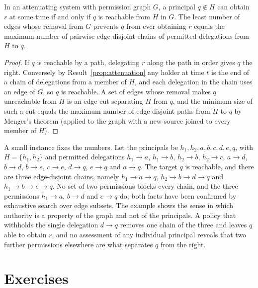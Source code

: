 \begin{newresult}\label{prop:cut}
In an attenuating system with permission graph $G$, a principal $q\notin H$ can obtain $r$ at some time if and only if $q$ is reachable from $H$ in $G$. The least number of edges whose removal from $G$ prevents $q$ from ever obtaining $r$ equals the maximum number of pairwise edge-disjoint chains of permitted delegations from $H$ to $q$.
\end{newresult}
\begin{proof}
If $q$ is reachable by a path, delegating $r$ along the path in order gives $q$ the right. Conversely by Result~\ref{prop:attenuation} any holder at time $t$ is the end of a chain of delegations from a member of $H$, and each delegation in the chain uses an edge of $G$, so $q$ is reachable. A set of edges whose removal makes $q$ unreachable from $H$ is an edge cut separating $H$ from $q$, and the minimum size of such a cut equals the maximum number of edge-disjoint paths from $H$ to $q$ by Menger's theorem (applied to the graph with a new source joined to every member of $H$).
\end{proof}

A small instance fixes the numbers. Let the principals be $h_1,h_2,a,b,c,d,e,q$, with $H=\{h_1,h_2\}$ and permitted delegations $h_1\to a$, $h_1\to b$, $h_2\to b$, $h_2\to c$, $a\to d$, $b\to d$, $b\to e$, $c\to e$, $d\to q$, $e\to q$ and $a\to q$. The target $q$ is reachable, and there are three edge-disjoint chains, namely $h_1\to a\to q$, $h_2\to b\to d\to q$ and $h_1\to b\to e\to q$. No set of two permissions blocks every chain, and the three permissions $h_1\to a$, $b\to d$ and $e\to q$ do; both facts have been confirmed by exhaustive search over edge subsets. The example shows the sense in which authority is a property of the graph and not of the principals. A policy that withholds the single delegation $d\to q$ removes one chain of the three and leaves $q$ able to obtain $r$, and no assessment of any individual principal reveals that two further permissions elsewhere are what separates $q$ from the right.

\section*{Exercises}

